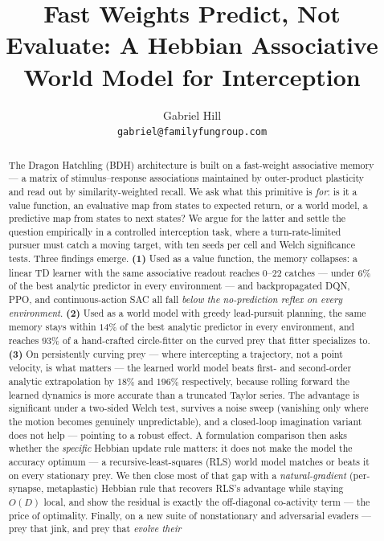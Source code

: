 \documentclass[11pt]{article}
\title{Fast Weights Predict, Not Evaluate: A Hebbian Associative World Model for Interception}
\author{Gabriel Hill\\\texttt{gabriel@familyfungroup.com}}
\date{}
\begin{document}
\maketitle

\begin{abstract}
\noindent
The Dragon Hatchling (BDH) architecture is built on a fast-weight associative memory --- a
matrix of stimulus--response associations maintained by outer-product plasticity and read out
by similarity-weighted recall. We ask what this primitive is \emph{for}: is it a value
function, an evaluative map from states to expected return, or a world model, a predictive map
from states to next states? We argue for the latter and settle the question empirically in a
controlled interception task, where a turn-rate-limited pursuer must catch a moving target,
with ten seeds per cell and Welch significance tests. Three findings emerge.
\textbf{(1)} Used as a value function, the memory collapses: a linear TD learner with the same
associative readout reaches $0$--$22$ catches --- under $6\%$ of the best analytic predictor in
every environment --- and backpropagated DQN, PPO, and continuous-action SAC all fall
\emph{below the no-prediction reflex on every environment}. \textbf{(2)} Used as a world model
with greedy lead-pursuit planning, the same memory stays within $14\%$ of the best analytic
predictor in every environment, and reaches $93\%$ of a hand-crafted circle-fitter on the
curved prey
that fitter specializes to. \textbf{(3)} On persistently curving prey --- where intercepting a
trajectory, not a point velocity, is what matters --- the learned world model beats first- and
second-order analytic extrapolation by $18\%$ and $196\%$ respectively, because rolling forward
the learned dynamics is more accurate than a truncated Taylor series. The advantage is
significant under a two-sided Welch test, survives a noise sweep (vanishing only where the
motion becomes genuinely unpredictable), and a closed-loop imagination variant does not help ---
pointing to a robust effect. A formulation comparison then asks whether the \emph{specific}
Hebbian update rule matters: it does not make the model the accuracy optimum --- a
recursive-least-squares (RLS) world model matches or beats it on every stationary prey. We then
close most of that gap with a \emph{natural-gradient} (per-synapse, metaplastic) Hebbian rule
that recovers RLS's advantage while staying $O(D)$ local, and show the residual is exactly the
off-diagonal co-activity term --- the price of optimality. Finally, on a new suite of
nonstationary and adversarial evaders --- prey that jink, and prey that \emph{evolve their
}
\end{abstract}
\end{document}
